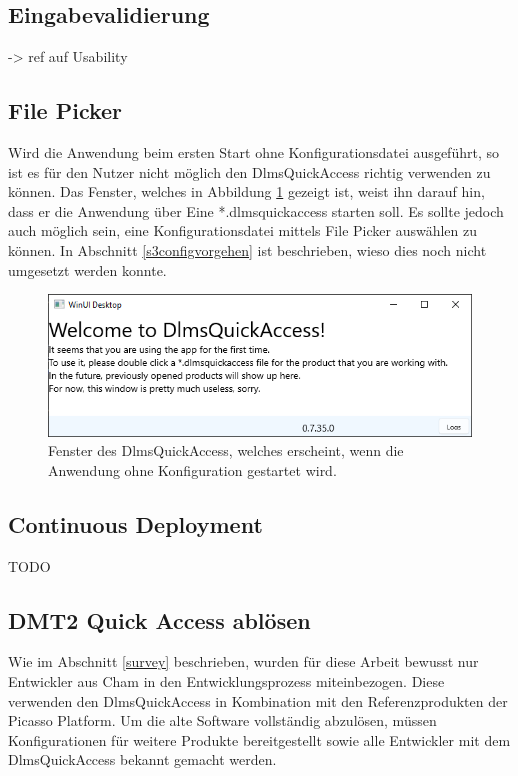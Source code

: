 \subsection{Eingabevalidierung}
-> ref auf Usability

\subsection{File Picker}\label{ausblick:filePicker}
Wird die Anwendung beim ersten Start ohne Konfigurationsdatei ausgeführt, so ist es für den Nutzer nicht möglich den DlmsQuickAccess richtig verwenden zu können.
Das Fenster, welches in Abbildung \ref{fig:welcomeScreenEmpty} gezeigt ist, weist ihn darauf hin, dass er die Anwendung über Eine *.dlmsquickaccess starten soll.
Es sollte jedoch auch möglich sein, eine Konfigurationsdatei mittels File Picker auswählen zu können.
In Abschnitt \ref{s3configvorgehen} ist beschrieben, wieso dies noch nicht umgesetzt werden konnte.

\begin{figure}[H]
   \centering
   \includegraphics[width=1.0\textwidth]{gfx/welcomeScreenEmpty.png}
   \caption{
       Fenster des DlmsQuickAccess, welches erscheint, wenn die Anwendung ohne Konfiguration gestartet wird.
   }
   \label{fig:welcomeScreenEmpty}
\end{figure}

\subsection{Continuous Deployment}
TODO

\subsection{\ac{DMT2} Quick Access ablösen}
Wie im Abschnitt \ref{survey} beschrieben, wurden für diese Arbeit bewusst nur Entwickler aus Cham in den Entwicklungsprozess miteinbezogen.
Diese verwenden den DlmsQuickAccess in Kombination mit den Referenzprodukten der Picasso Platform.
Um die alte Software vollständig abzulösen, müssen Konfigurationen für weitere Produkte bereitgestellt sowie alle Entwickler mit dem DlmsQuickAccess bekannt gemacht werden.


